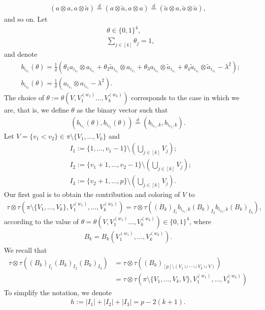 \documentclass[12pt,reqno]{amsart}
\theoremstyle{plain}
\newcommand{\1}{\mathbf{1}}
\begin{document}
\begin{align*}
    (a\otimes a,a\otimes \tilde{a})\overset{d}{=}(a\otimes \tilde{a},a\otimes a)\overset{d}{=}(\tilde{a}\otimes a,\tilde{a}\otimes \tilde{a}),
\end{align*}
and so on. Let
\begin{align*}
    &\theta \in \{0,1\}^4,\\
    &\sum_{j \in [4]}\theta_j=1,
\end{align*}
and denote 
\begin{align*}
    &b_{i_{v_1}}(\theta)=\frac{1}{\delta}\left(\theta_1 a_{i_{v_1}}\otimes a_{i_{v_1}}+\theta_2 \tilde{a}_{i_{v_1}}\otimes a_{i_{v_1}}+\theta_3 a_{i_{v_1}}\otimes \tilde{a}_{i_{v_1}}+\theta_4 \tilde{a}_{i_{v_1}}\otimes \tilde{a}_{i_{v_1}}-\lambda^2\right);\\
    &b_{i_{v_2}}(\theta)=\frac{1}{\delta}\left(a_{i_{v_1}}\otimes a_{i_{v_1}}-\lambda^2\right).
\end{align*}
The choice of $\theta:=\theta\left(V, V_1^{(w_1)}\ldots, V_k^{(w_k)}\right)$ corresponds to the case in which we are, that is, we define $\theta$ as the binary vector such that
\begin{align*}
    \left(b_{i_{v_1}}(\theta),b_{i_{v_2}}(\theta)\right)\overset{d}{=}\left(b_{i_{v_1},k},b_{i_{v_2},k}\right).
\end{align*}
Let $V=\{v_1<v_2\} \in \pi\setminus\{V_1,\ldots, V_k\}$ and
\begin{align*}
    &I_1:=\{1,\ldots,v_1-1\}\setminus \left(\bigcup_{j \in [k]}V_j\right);\\
    &I_2:=\{v_1+1,\ldots,v_2-1\}\setminus \left(\bigcup_{j \in [k]}V_j\right);\\
    &I_3:=\{v_2+1,\ldots,p\}\setminus \left(\bigcup_{j \in [k]}V_j\right).
\end{align*}
Our first goal is to obtain the contribution and coloring of $V$ to
\begin{align*}
    \tau\otimes\tau \left(\pi\setminus \{V_1,\ldots,V_{k}\},V_1^{(w_1)},\ldots,V_{k}^{(w_{k})}\right)=\tau\otimes \tau\left(\left(B_k\right)_{I_1}b_{i_{v_1},k}\left(B_k\right)_{I_2}b_{i_{v_2},k}\left(B_k\right)_{I_3}\right),
\end{align*}
according to the value of $\theta= \theta\left(V, V_1^{(w_1)}\ldots, V_k^{(w_k)}\right)\in \{0,1\}^4$, where 
\begin{align*}
    B_k=B_k\left(V_1^{(w_1)},\ldots,V_k^{(w_k)}\right).
\end{align*}
We recall that
\begin{align*}
    \tau\otimes\tau\left(\left(B_k\right)_{I_1}\left(B_k\right)_{I_2}\left(B_k\right)_{I_3}\right)&=\tau\otimes \tau\left(\left(B_k\right)_{[p]\setminus \left(V_1\cup \cdots \cup V_k \cup V\right)}\right)\\
    &=\tau\otimes \tau\left(\pi\setminus\{V_1,\ldots,V_k,V\},V_1^{(w_1)},\ldots,V_k^{(w_k)}\right)
\end{align*}
To simplify the notation, we denote
\begin{align}\label{eq: power of delta}
    h:=|I_1|+|I_2|+|I_3|=p-2(k+1).
\end{align}
\end{document}
